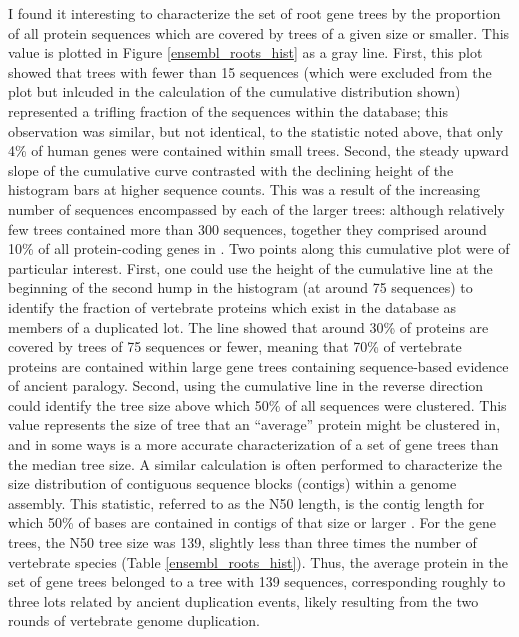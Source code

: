 I found it interesting to characterize the set of root \cmp gene trees
by the proportion of all protein sequences which are covered by trees
of a given size or smaller. This value is plotted in Figure
\ref{ensembl_roots_hist} as a gray line. First, this plot showed that
trees with fewer than 15 sequences (which were excluded from the plot
but inlcuded in the calculation of the cumulative distribution shown)
represented a trifling fraction of the sequences within the \cmp
database; this observation was similar, but not identical, to the
statistic noted above, that only 4\% of human genes were contained
within small trees. Second, the steady upward slope of the cumulative
curve contrasted with the declining height of the histogram bars at
higher sequence counts. This was a result of the increasing number of
sequences encompassed by each of the larger trees: although relatively
few trees contained more than 300 sequences, together they comprised
around 10\% of all protein-coding genes in \cmp. Two points along this
cumulative plot were of particular interest. First, one could use the
height of the cumulative line at the beginning of the second hump in
the histogram (at around 75 sequences) to identify the fraction of
vertebrate proteins which exist in the \cmp database as members of a
duplicated \mammln \ac{lot}. The line showed that around 30\% of
proteins are covered by trees of 75 sequences or fewer, meaning that
70\% of vertebrate proteins are contained within large gene trees
containing sequence-based evidence of ancient paralogy. Second, using
the cumulative line in the reverse direction could identify the tree
size above which 50\% of all sequences were clustered. This value
represents the size of tree that an ``average'' protein might be
clustered in, and in some ways is a more accurate characterization of
a set of gene trees than the median tree size. A similar calculation
is often performed to characterize the size distribution of contiguous
sequence blocks (contigs) within a genome assembly. This statistic,
referred to as the N50 length, is the contig length for which 50\% of
bases are contained in contigs of that size or larger
\citep{Miller2010}. For the \cmp gene trees, the N50 tree size was
139, slightly less than three times the number of vertebrate species
(Table \ref{ensembl_roots_hist}). Thus, the average protein in the set
of \cmp gene trees belonged to a tree with 139 sequences,
corresponding roughly to three \mammln \acp{lot} related by ancient
duplication events, likely resulting from the two rounds of vertebrate
genome duplication.

